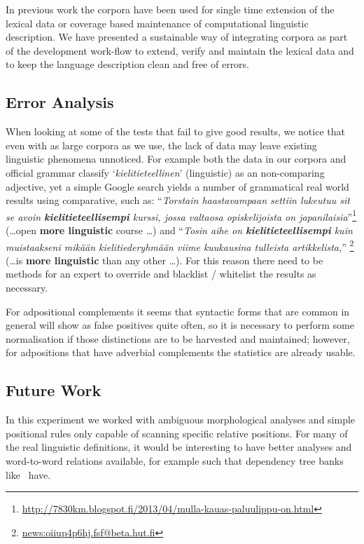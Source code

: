 \documentclass[a5paper]{article}
\begin{document}
In previous work the corpora have been used for single time extension of the
lexical data or coverage based maintenance of computational linguistic
description. We have presented a sustainable way of integrating corpora as part
of the development work-flow to extend, verify and maintain the lexical data
and to keep the language description clean and free of errors.

\subsection{Error Analysis}

When looking at some of the tests that fail to give good results, we notice
that even with as large corpora as we use, the lack of data may leave existing
linguistic phenomena unnoticed. For example both the data in our corpora and
official grammar classify `\emph{kielitieteellinen}' (linguistic) as an
non-comparing adjective, yet a simple Google search yields a number of 
grammatical real world results using comparative, such as: 
``\emph{Torstain haastavampaan
    settiin lukeutuu sit se avoin \textbf{kielitieteellisempi} kurssi, jossa
valtaosa opiskelijoista on
japanilaisia}''\footnote{\url{http://7830km.blogspot.fi/2013/04/mulla-kauas-paluulippu-on.html}}
(\ldots open \textbf{more linguistic} course \ldots) and ``\emph{Tosin aihe on
\textbf{kielitieteellisempi} kuin muistaakseni mikään kielitiederyhmään viime
kuukausina tulleista artikkelista,}''
\footnote{\url{news:oiiup4p6hj.fsf@beta.hut.fi}} (\ldots is \textbf{more
linguistic} than any other \ldots). For this reason there need to be methods
for an expert to override and blacklist / whitelist the results as necessary.

For adpositional complements it seems that syntactic forms that are common
in general will show as false positives quite often, so it is necessary to
perform some normalisation if those distinctions are to be harvested and
maintained; however, for adpositions that have adverbial complements the
statistics are already usable.

\subsection{Future Work}

In this experiment we worked with ambiguous morphological analyses and simple
positional rules only capable of scanning specific relative
positions. For many of the real linguistic definitions, it would be interesting
to have better analyses and word-to-word relations available, for example such 
that dependency tree banks like~\cite{haverinen2013building} have.
\end{document}

